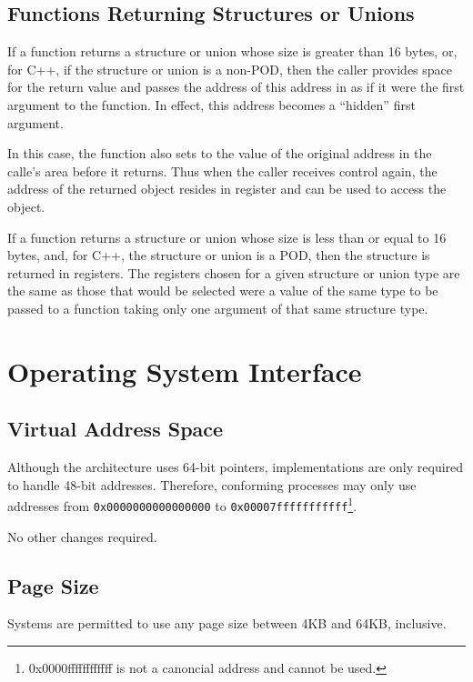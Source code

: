 \subsection{Functions Returning Structures or Unions}

If a function returns a structure or union whose size is greater than
16 bytes, or, for C++, if the structure or union is a non-POD, then
the caller provides space for the return value and passes the address
of this address in \RAX as if it were the first argument to the
function.  In effect, this address becomes a ``hidden'' first
argument.

In this case, the function also sets \RAX to the value of the original
address in the calle's area before it returns.  Thus when the caller
receives control again, the address of the returned object resides in
register \RAX and can be used to access the object.
  
If a function returns a structure or union whose size is less than or
equal to 16 bytes, and, for C++, the structure or union is a POD, then
the structure is returned in registers.  The registers chosen for a
given structure or union type are the same as those that would be
selected were a value of the same type to be passed to a function
taking only one argument of that same structure type.

\section{Operating System Interface}

\subsection{Virtual Address Space}

Although the \xARCH architecture uses 64-bit pointers, implementations
are only required to handle 48-bit addresses.  Therefore, conforming
processes may only use addresses from \texttt{0x0000000000000000} to
\texttt{0x00007fffffffffff}\footnote{0x0000ffffffffffff is not a
  canoncial address and cannot be used.}.

No other changes required.

\subsection{Page Size}

Systems are permitted to use any page size between 4KB and 64KB,
inclusive.


